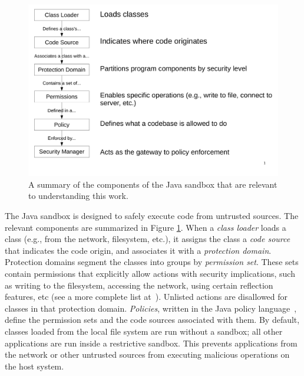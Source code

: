 \documentclass{sig-alternate}
\begin{document}
\begin{figure}
\includegraphics[width=\columnwidth]{sandbox_overview}
\caption{A summary of the components of the Java sandbox that are relevant
\label{fig:Sandbox-high-level-summary}
to understanding this work.}
\end{figure}

The Java sandbox is designed to safely execute code from untrusted
sources. 
The relevant components are summarized in Figure
\ref{fig:Sandbox-high-level-summary}. 
When a \textit{class loader} loads a class (e.g., from
the network, filesystem, etc.), it assigns the class a \textit{code source} that
indicates the code origin, and associates it with a \textit{protection
  domain}. Protection domains segment the classes into groups by
\textit{permission set}. These sets
contain permissions that explicitly allow actions with security
implications, such as writing to the filesystem, accessing the network, using
certain reflection features, etc (see a more complete list
at~\cite{_permissions_2014}).  Unlisted actions are disallowed for classes in
that protection domain.  \emph{Policies}, written in the Java policy
language~\cite{_java_policy_language}, define the permission sets and the code
sources associated with them. 
By default, classes loaded from the local file system are run
without a sandbox; all other applications are run inside a restrictive
sandbox.  This prevents applications from the network or other untrusted sources
from executing malicious operations on the host system.
\end{document}
